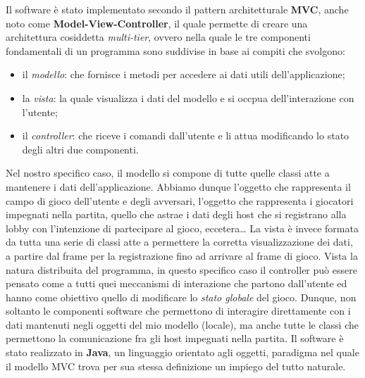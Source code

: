 Il software è stato implementato secondo il pattern architetturale \textbf{MVC},
anche noto come \textbf{Model-View-Controller}, il quale permette di creare una
architettura cosiddetta \textit{multi-tier}, ovvero nella quale le tre
componenti fondamentali di un programma sono suddivise in base ai compiti che
svolgono:
\begin{itemize}
	\item il \textit{modello}: che fornisce i metodi per accedere ai dati utili
	dell'applicazione;
	\item la \textit{vista}: la quale visualizza i dati del modello e si occpua
	dell'interazione con l'utente;
	\item il \textit{controller}: che riceve i comandi dall'utente e li attua
	modificando lo stato degli altri due componenti.
\end{itemize}
Nel nostro specifico caso, il modello si compone di tutte quelle classi atte a
mantenere i dati dell'applicazione. Abbiamo dunque l'oggetto che rappresenta il
campo di gioco dell'utente e degli avversari, l'oggetto che rappresenta i
giocatori impegnati nella partita, quello che astrae i dati degli host che si
registrano alla lobby con l'intenzione di partecipare al gioco,
eccetera\dots\newline
La vista è invece formata da tutta una serie di classi atte a permettere la
corretta visualizzazione dei dati, a partire dal frame per la registrazione fino
ad arrivare al frame di gioco.\newline
Vista la natura distribuita del programma, in questo specifico caso il
controller può essere pensato come a tutti quei meccanismi di interazione che
partono dall'utente ed hanno come obiettivo quello di modificare lo
\textit{stato globale} del gioco. Dunque, non soltanto le componenti software
che permettono di interagire direttamente con i dati mantenuti negli oggetti
del mio modello (locale), ma anche tutte le classi che permettono la
comunicazione fra gli host impegnati nella partita.\newline
Il software è stato realizzato in \textbf{Java}, un linguaggio orientato agli
oggetti, paradigma nel quale il modello MVC trova per sua stessa definizione un
impiego del tutto naturale.
